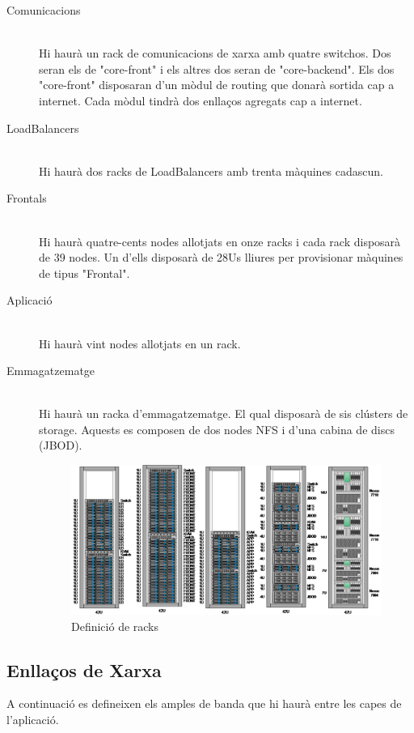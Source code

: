 \begin{description}

\item[Comunicacions] \hfill \\ 
    Hi haurà un rack de comunicacions de xarxa amb quatre switchos. Dos seran els de "core-front" i els altres dos seran de "core-backend". Els dos "core-front" disposaran d'un mòdul de routing que donarà sortida cap a internet. Cada mòdul tindrà dos enllaços agregats cap a internet. 
    
\item[LoadBalancers] \hfill \\
    Hi haurà dos racks de LoadBalancers amb trenta màquines cadascun.

\item[Frontals] \hfill \\
    Hi haurà quatre-cents nodes allotjats en onze racks i cada rack disposarà de 39 nodes. Un d'ells disposarà de 28Us lliures per provisionar màquines de tipus "Frontal".

\item[Aplicació] \hfill \\
    Hi haurà vint nodes allotjats en un rack. 
    
\item[Emmagatzematge] \hfill \\
    Hi haurà un racka d'emmagatzematge. El qual disposarà de sis clústers de storage. Aquests es composen de dos nodes NFS i d'una cabina de discs (JBOD).

\begin{figure}[H]
    \centering
    \includegraphics[width=1.0\textwidth]{racks}
    \caption{Definició de racks \label{fig:racks}}    
\end{figure}


\end{description}

\subsection{Enllaços de Xarxa}
\label{sec:links-xarxa}
A continuació es defineixen els amples de banda que hi haurà entre les capes de l'aplicació.

